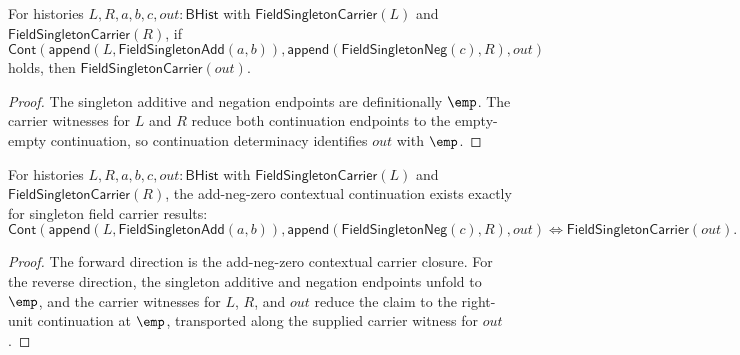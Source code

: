 \begin{theorem}
\label{thm:field-singleton-add-neg-zero-context-continuation-result-carrier}
For histories $L,R,a,b,c,out:\mathsf{BHist}$ with
$\mathsf{FieldSingletonCarrier}(L)$ and $\mathsf{FieldSingletonCarrier}(R)$, if
$$
\mathsf{Cont}
  (\mathsf{append}(L,\mathsf{FieldSingletonAdd}(a,b)),
   \mathsf{append}(\mathsf{FieldSingletonNeg}(c),R),out)
$$
holds, then $\mathsf{FieldSingletonCarrier}(out)$.
\end{theorem}
\begin{proof}
The singleton additive and negation endpoints are definitionally $\emp$. The
carrier witnesses for $L$ and $R$ reduce both continuation endpoints to the
empty-empty continuation, so continuation determinacy identifies $out$ with
$\emp$.
\end{proof}

\begin{theorem}
\label{thm:field-singleton-add-neg-zero-context-continuation-result-iff}
For histories $L,R,a,b,c,out:\mathsf{BHist}$ with
$\mathsf{FieldSingletonCarrier}(L)$ and $\mathsf{FieldSingletonCarrier}(R)$,
the add-neg-zero contextual continuation exists exactly for singleton field
carrier results:
$$
\mathsf{Cont}
  (\mathsf{append}(L,\mathsf{FieldSingletonAdd}(a,b)),
   \mathsf{append}(\mathsf{FieldSingletonNeg}(c),R),out)
\Longleftrightarrow
\mathsf{FieldSingletonCarrier}(out).
$$
\end{theorem}
\begin{proof}
The forward direction is the add-neg-zero contextual carrier closure. For the
reverse direction, the singleton additive and negation endpoints unfold to
\(\emp\), and the carrier witnesses for \(L\), \(R\), and \(out\) reduce the
claim to the right-unit continuation at \(\emp\), transported along the
supplied carrier witness for \(out\).
\end{proof}

